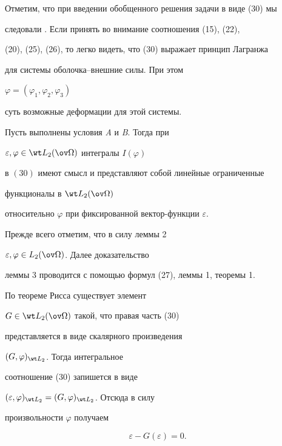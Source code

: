  


Отметим, что при введении обобщенного решения задачи в виде (30) мы 


следовали \cite{1}. Если принять во внимание соотношения (15), (22), 


(20), (25), (26), то легко видеть, что (30) выражает принцип Лагранжа 


для системы оболочка--внешние силы. При этом 


$\varphi=(\varphi_1,\varphi_2,\varphi_3)$ 


суть возможные деформации для этой системы. 


 


\begin{lem} 


Пусть выполнены условия {\em A} и {\em B}. Тогда при 


$\varepsilon,\varphi\in\wt L_2(\ov\Omega)$ интегралы $I(\varphi)$ 


в $(30)$ имеют смысл и представляют собой линейные ограниченные 


функционалы в $\wt L_2(\ov\Omega)$ 


относительно $\varphi$ при фиксированной вектор-функции $\varepsilon$. 


\end{lem} 


 


Прежде всего отметим, что в силу леммы 2\; 


$\varepsilon,\varphi\in L_2(\ov\Omega)$. Далее доказательство 


леммы 3 проводится с помощью формул (27), леммы 1, теоремы 1. 


 


По теореме Рисса существует элемент 


$G\in\wt L_2(\ov\Omega)$ такой, что правая часть (30) 


представляется в виде скалярного произведения 


$(G,\varphi)_{\wt L_2}$. Тогда интегральное 


соотношение (30) запишется в виде 


$(\varepsilon,\varphi)_{\wt L_2}=(G,\varphi)_{\wt L_2}$. Отсюда в силу 


произвольности $\varphi$ получаем 


\begin{equation} 


\varepsilon-G(\varepsilon)=0. 


\end{equation} 


